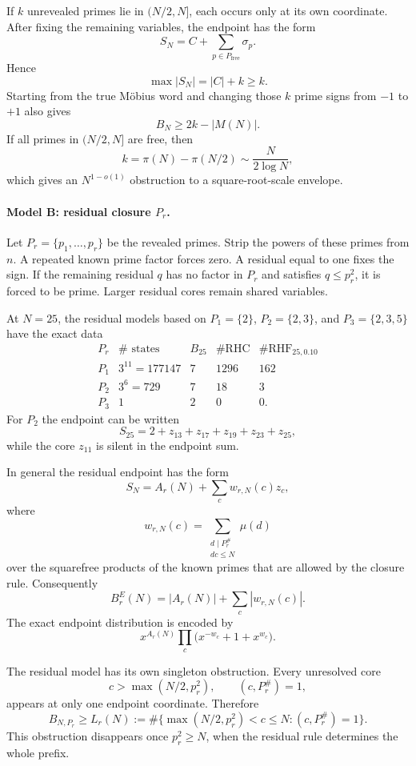 \documentclass[11pt]{article}
\newcommand{\RHC}{\mathrm{RHC}}
\newcommand{\RHF}{\mathrm{RHF}}
\begin{document}
If $k$ unrevealed primes lie in $(N/2,N]$, each occurs only at its own coordinate. After fixing the remaining variables, the endpoint has the form
\[
 S_N=C+\sum_{p\in P_{\mathrm{free}}}\sigma_p.
\]
Hence
\[
 \max|S_N|=|C|+k\ge k.
\]
Starting from the true Möbius word and changing those $k$ prime signs from $-1$ to $+1$ also gives
\[
 B_N\ge 2k-|M(N)|.
\]
If all primes in $(N/2,N]$ are free, then
\[
 k=\pi(N)-\pi(N/2)\sim\frac{N}{2\log N},
\]
which gives an $N^{1-o(1)}$ obstruction to a square-root-scale envelope.

\paragraph{Model B: residual closure $P_r$.}
Let $P_r=\{p_1,\ldots,p_r\}$ be the revealed primes. Strip the powers of these primes from $n$. A repeated known prime factor forces zero. A residual equal to one fixes the sign. If the remaining residual $q$ has no factor in $P_r$ and satisfies $q\le p_r^2$, it is forced to be prime. Larger residual cores remain shared variables.

At $N=25$, the residual models based on $P_1=\{2\}$, $P_2=\{2,3\}$, and $P_3=\{2,3,5\}$ have the exact data
\[
\begin{array}{c|r|r|r|r}
P_r&\#\text{ states}&B_{25}&\#\RHC&\#\RHF_{25,0.10}\\ \hline
P_1&3^{11}=177147&7&1296&162\\
P_2&3^6=729&7&18&3\\
P_3&1&2&0&0.
\end{array}
\]
For $P_2$ the endpoint can be written
\[
 S_{25}=2+z_{13}+z_{17}+z_{19}+z_{23}+z_{25},
\]
while the core $z_{11}$ is silent in the endpoint sum.

In general the residual endpoint has the form
\[
 S_N=A_r(N)+\sum_c w_{r,N}(c)z_c,
\]
where
\[
 w_{r,N}(c)
 =\sum_{\substack{d\mid P_r^\#\\dc\le N}}\mu(d)
\]
over the squarefree products of the known primes that are allowed by the closure rule. Consequently
\[
 B_{r}^{E}(N)=|A_r(N)|+\sum_c|w_{r,N}(c)|.
\]
The exact endpoint distribution is encoded by
\[
 x^{A_r(N)}\prod_c\bigl(x^{-w_c}+1+x^{w_c}\bigr).
\]

The residual model has its own singleton obstruction. Every unresolved core
\[
 c>\max(N/2,p_r^2),\qquad(c,P_r^\#)=1,
\]
appears at only one endpoint coordinate. Therefore
\[
 B_{N,P_r}\ge
 L_r(N):=
 \#\{\max(N/2,p_r^2)<c\le N:(c,P_r^\#)=1\}.
\]
This obstruction disappears once $p_r^2\ge N$, when the residual rule determines the whole prefix.
\end{document}
